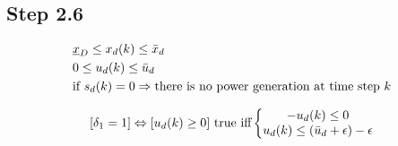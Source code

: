 \subsection*{Step 2.6}

\begin{align*}
& \underline{x}_D \leq x_d(k) \leq \Bar{x}_d \\
& 0 \leq u_d(k) \leq \Bar{u}_d \\
& \text{if } s_d(k) = 0 \Rightarrow \text{there is no power generation at time step } k 
\end{align*}

$$
[\delta_1 = 1] \Leftrightarrow [u_d(k) \geq 0] \text{ true iff}
\left\{\begin{matrix}-u_d(k)\leq 0 \\ u_d(k) \leq (\Bar{u}_d+\epsilon)-\epsilon\end{matrix}\right.

$$
